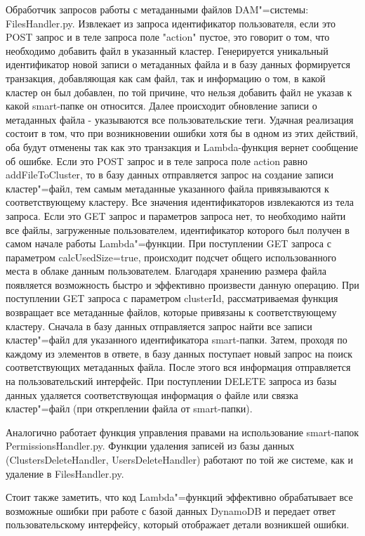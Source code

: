 Обработчик запросов работы с метаданными файлов DAM"=системы: FilesHandler.py. Извлекает из запроса идентификатор пользователя, если это POST запрос и в теле запроса поле "action" пустое, это говорит о том, что необходимо добавить файл в указанный кластер. Генерируется уникальный идентификатор новой записи о метаданных файла и в базу данных формируется транзакция, добавляющая как сам файл, так и информацию о том, в какой кластер он был добавлен, по той причине, что нельзя добавить файл не указав к какой smart-папке он относится. Далее происходит обновление записи о метаданных файла - указываются все пользовательские теги. Удачная реализация состоит в том, что при возникновении ошибки хотя бы в одном из этих действий, оба будут отменены так как это транзакция и Lambda-функция вернет сообщение об ошибке. Если это POST запрос и в теле запроса поле action равно addFileToCluster, то в базу данных отправляется запрос на создание записи кластер"=файл, тем самым метаданные указанного файла привязываются к соответствующему кластеру. Все значения идентификаторов извлекаются из тела запроса. Если это GET запрос и параметров запроса нет, то необходимо найти все файлы, загруженные пользователем, идентификатор которого был получен в самом начале работы Lambda"=функции. При поступлении GET запроса с параметром calcUsedSize=true, происходит подсчет общего использованного места в облаке данным пользователем. Благодаря хранению размера файла появляется возможность быстро и эффективно произвести данную операцию. При поступлении GET запроса с параметром clusterId, рассматриваемая функция возвращает все метаданные файлов, которые привязаны к соответствующему кластеру. Сначала в базу данных отправляется запрос найти все записи кластер"=файл для указанного идентификатора smart-папки. Затем, проходя по каждому из элементов в ответе, в базу данных поступает новый запрос на поиск соответствующих метаданных файла. После этого вся информация отправляется на пользовательский интерфейс. При поступлении DELETE запроса из базы данных удаляется соответствующая информация о файле или связка кластер"=файл (при откреплении файла от smart-папки).

Аналогично работает функция управления правами на использование smart-папок PermissionsHandler.py. Функции удаления записей из базы данных (ClustersDeleteHandler, UsersDeleteHandler) работают по той же системе, как и удаление в FilesHandler.py.

Стоит также заметить, что код Lambda"=функций эффективно обрабатывает все возможные ошибки при работе с базой данных DynamoDB и передает ответ пользовательскому интерфейсу, который отображает детали возникшей ошибки.

